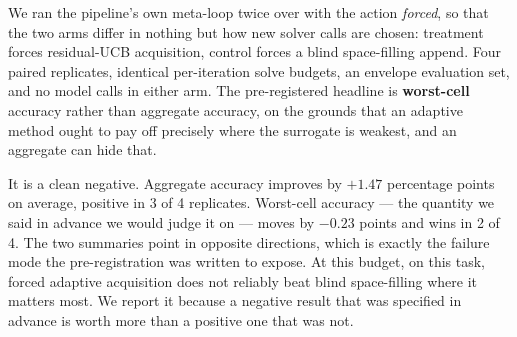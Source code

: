We ran the pipeline's own meta-loop twice over with the action \emph{forced},
so that the two arms differ in nothing but how new solver calls are chosen:
treatment forces residual-UCB acquisition, control forces a blind
space-filling append. Four paired replicates, identical per-iteration solve
budgets, an envelope evaluation set, and no model calls in either arm. The
pre-registered headline is \textbf{worst-cell} accuracy rather than aggregate
accuracy, on the grounds that an adaptive method ought to pay off precisely
where the surrogate is weakest, and an aggregate can hide that.

It is a clean negative. Aggregate accuracy improves by $+1.47$ percentage
points on average, positive in 3 of 4 replicates. Worst-cell accuracy --- the
quantity we said in advance we would judge it on --- moves by $-0.23$ points
and wins in 2 of 4. The two summaries point in opposite directions, which is
exactly the failure mode the pre-registration was written to expose. At this
budget, on this task, forced adaptive acquisition does not reliably beat blind
space-filling where it matters most. We report it because a negative result
that was specified in advance is worth more than a positive one that was not.

